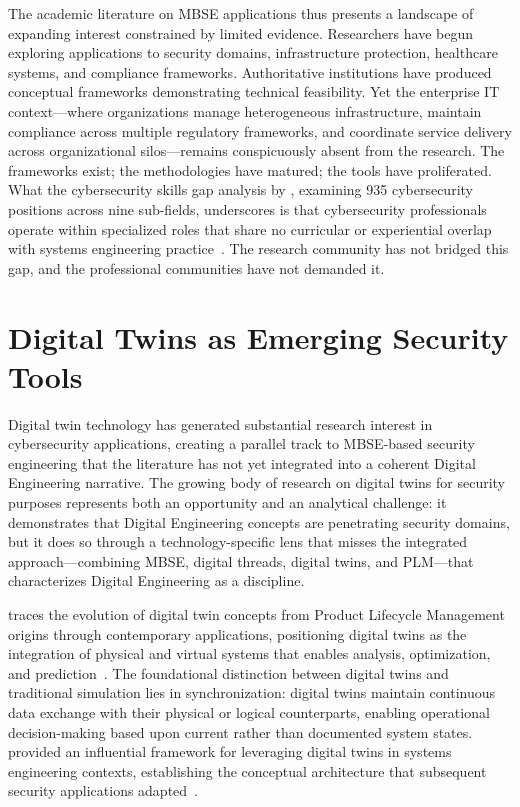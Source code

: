 The academic literature on MBSE applications thus presents a landscape of expanding interest constrained by limited evidence. Researchers have begun exploring applications to security domains, infrastructure protection, healthcare systems, and compliance frameworks. Authoritative institutions have produced conceptual frameworks demonstrating technical feasibility. Yet the enterprise IT context---where organizations manage heterogeneous infrastructure, maintain compliance across multiple regulatory frameworks, and coordinate service delivery across organizational silos---remains conspicuously absent from the research. The frameworks exist; the methodologies have matured; the tools have proliferated. What the cybersecurity skills gap analysis by \citeauthor{Ramezan_2023}, examining 935 cybersecurity positions across nine sub-fields, underscores is that cybersecurity professionals operate within specialized roles that share no curricular or experiential overlap with systems engineering practice~\parencite{Ramezan_2023}. The research community has not bridged this gap, and the professional communities have not demanded it.

\section{Digital Twins as Emerging Security Tools}

Digital twin technology has generated substantial research interest in cybersecurity applications, creating a parallel track to MBSE-based security engineering that the literature has not yet integrated into a coherent Digital Engineering narrative. The growing body of research on digital twins for security purposes represents both an opportunity and an analytical challenge: it demonstrates that Digital Engineering concepts are penetrating security domains, but it does so through a technology-specific lens that misses the integrated approach---combining MBSE, digital threads, digital twins, and PLM---that characterizes Digital Engineering as a discipline.

\citeauthor{Grieves_2023} traces the evolution of digital twin concepts from Product Lifecycle Management origins through contemporary applications, positioning digital twins as the integration of physical and virtual systems that enables analysis, optimization, and prediction~\parencite{Grieves_2023}. The foundational distinction between digital twins and traditional simulation lies in synchronization: digital twins maintain continuous data exchange with their physical or logical counterparts, enabling operational decision-making based upon current rather than documented system states. \citeauthor{madni2018leveraging} provided an influential framework for leveraging digital twins in systems engineering contexts, establishing the conceptual architecture that subsequent security applications adapted~\parencite{madni2018leveraging}.


